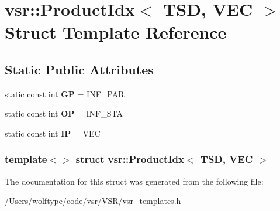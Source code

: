 \hypertarget{structvsr_1_1_product_idx_3_01_t_s_d_00_01_v_e_c_01_4}{\section{vsr\-:\-:Product\-Idx$<$ T\-S\-D, V\-E\-C $>$ Struct Template Reference}
\label{structvsr_1_1_product_idx_3_01_t_s_d_00_01_v_e_c_01_4}
}
\subsection*{Static Public Attributes}
\begin{DoxyCompactItemize}
\item 
\hypertarget{structvsr_1_1_product_idx_3_01_t_s_d_00_01_v_e_c_01_4_a3ef4d7f55e02bcd5900e933c6c921f99}{static const int {\bfseries G\-P} = I\-N\-F\-\_\-\-P\-A\-R}\label{structvsr_1_1_product_idx_3_01_t_s_d_00_01_v_e_c_01_4_a3ef4d7f55e02bcd5900e933c6c921f99}

\item 
\hypertarget{structvsr_1_1_product_idx_3_01_t_s_d_00_01_v_e_c_01_4_a6619706dbc2e0127ec812c5a5a5901b1}{static const int {\bfseries O\-P} = I\-N\-F\-\_\-\-S\-T\-A}\label{structvsr_1_1_product_idx_3_01_t_s_d_00_01_v_e_c_01_4_a6619706dbc2e0127ec812c5a5a5901b1}

\item 
\hypertarget{structvsr_1_1_product_idx_3_01_t_s_d_00_01_v_e_c_01_4_a37fed7b6acfad6dfee325cf5aa41242d}{static const int {\bfseries I\-P} = V\-E\-C}\label{structvsr_1_1_product_idx_3_01_t_s_d_00_01_v_e_c_01_4_a37fed7b6acfad6dfee325cf5aa41242d}

\end{DoxyCompactItemize}
\subsubsection*{template$<$$>$ struct vsr\-::\-Product\-Idx$<$ T\-S\-D, V\-E\-C $>$}



The documentation for this struct was generated from the following file\-:\begin{DoxyCompactItemize}
\item 
/\-Users/wolftype/code/vsr/\-V\-S\-R/vsr\-\_\-templates.\-h\end{DoxyCompactItemize}
